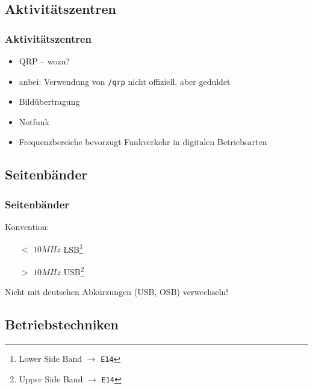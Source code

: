 \subsection{Aktivitätszentren}

\begin{frame}
  \frametitle{Aktivitätszentren}

  \begin{itemize}[<+->]
    \item QRP -- wozu?
    \item anbei: Verwendung von \texttt{/qrp} nicht offiziell, aber geduldet
    \item Bildübertragung
    \item Notfunk
    \item Frequenzbereiche bevorzugt Funkverkehr in digitalen Betriebsarten
  \end{itemize}

\end{frame}

\subsection{Seitenbänder}

\begin{frame}
  \frametitle{Seitenbänder}

  Konvention: \bigskip

  \begin{itemize}
    \item [$<$] $10 MHz$ LSB\footnote{Lower Side Band $\rightarrow$ \texttt{E14}} \\[1em]
    \item [$>$] $10 MHz$ USB\footnote{Upper Side Band $\rightarrow$ \texttt{E14}} \\[3em]
  \end{itemize}

  Nicht mit deutschen Abkürzungen (USB, OSB) verwechseln!

\end{frame}

\subsection{Betriebstechniken}

